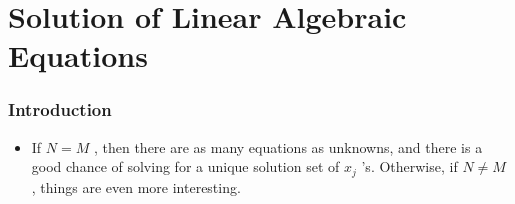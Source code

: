\documentclass[a4wide,10pt]{article}
\begin{document}


\pagebreak

\section{Solution of Linear Algebraic Equations} %
\label{sec:solution_of_linear_algebraic_equations}

\addtocounter{subsubsection}{-4}
\subsubsection{Introduction} %
\label{ssub:introduction}
\begin{itemize}
	\item If $N = M$ , then there are as many equations as unknowns, and there is a good chance of solving for a unique solution set of $x_j$ ’s. Otherwise, if $N \neq M$ , things are even more interesting.
\end{itemize}
\end{document}
